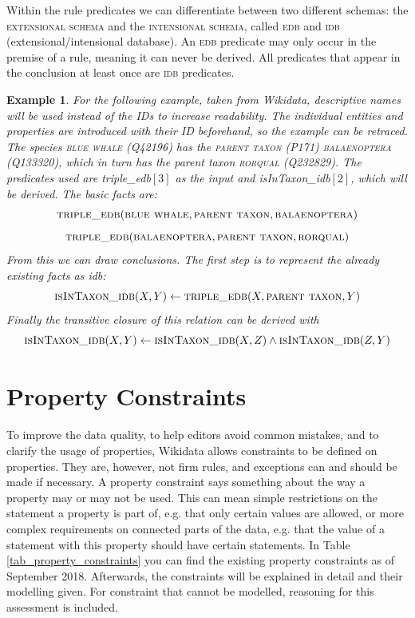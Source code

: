 \documentclass[hyperref,bachelorofscience,fleqn]{cgvpub}
\newtheorem{example}{Example}
\begin{document}
Within the rule predicates we can differentiate between two different schemas: the \textsc{extensional schema} and the \textsc{intensional schema}, called \textsc{edb} and \textsc{idb} (extensional/intensional database). An \textsc{edb} predicate may only occur in the premise of a rule, meaning it can never be derived. All predicates that appear in the conclusion at least once are \textsc{idb} predicates.

\begin{example}
For the following example, taken from Wikidata, descriptive names will be used instead of the IDs to increase readability. The individual entities and properties are introduced with their ID beforehand, so the example can be retraced. The species \textsc{blue whale} (Q42196) has the \textsc{parent taxon} (P171) \textsc{balaenoptera} (Q133320), which in turn has the parent taxon \textsc{rorqual} (Q232829). The predicates used are triple\_edb\([3]\) as the input and isInTaxon\_idb\([2]\), which will be derived. The basic facts are:
\[\textsc{triple\_edb}(\textsc{blue whale}, \textsc{parent taxon}, \textsc{balaenoptera})\]
\[\textsc{triple\_edb}(\textsc{balaenoptera}, \textsc{parent taxon}, \textsc{rorqual})\]
From this we can draw conclusions. The first step is to represent the already existing facts as idb:
\[\textsc{isInTaxon\_idb}(X, Y) \leftarrow \textsc{triple\_edb}(X, \textsc{parent taxon}, Y)\]
Finally the transitive closure of this relation can be derived with
\[\textsc{isInTaxon\_idb}(X, Y) \leftarrow \textsc{isInTaxon\_idb}(X, Z) \wedge \textsc{isInTaxon\_idb}(Z, Y)\]
\end{example}

\chapter{Property Constraints}\label{cha_property_constraints}

To improve the data quality, to help editors avoid common mistakes, and to clarify the usage of properties, Wikidata allows constraints to be defined on properties. They are, however, not firm rules, and exceptions can and should be made if necessary. A property constraint says something about the way a property may or may not be used. This can mean simple restrictions on the statement a property is part of, e.g. that only certain values are allowed, or more complex requirements on connected parts of the data, e.g. that the value of a statement with this property should have certain statements. In Table \ref{tab_property_constraints} you can find the existing property constraints as of September 2018. Afterwards, the constraints will be explained in detail and their modelling given. For constraint that cannot be modelled, reasoning for this assessment is included.
\end{document}
